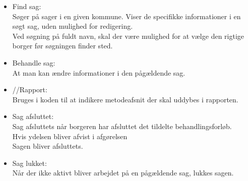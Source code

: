 \begin{itemize}
\renewcommand\labelitemi{--}
\item Find sag: \\
Søger på sager i en given kommune. Viser de specifikke informationer i en søgt sag, uden mulighed for redigering. \\
Ved søgning på fuldt navn, skal der være mulighed for at vælge den rigtige borger før søgningen finder sted.
\item Behandle sag: \\
At man kan ændre informationer i den pågældende sag.
\item //Rapport: \\
Bruges i koden til at indikere metodeafsnit der skal uddybes i rapporten.
\item Sag afsluttet: \\
Sag afsluttets når borgeren har afsluttet det tildelte behandlingsforløb. \\
Hvis ydelsen bliver afvist i afgørelsen \\
Sagen bliver afsluttets.
\item Sag lukket: \\
Når der ikke aktivt bliver arbejdet på en pågældende sag, lukkes sagen.
\end{itemize}

